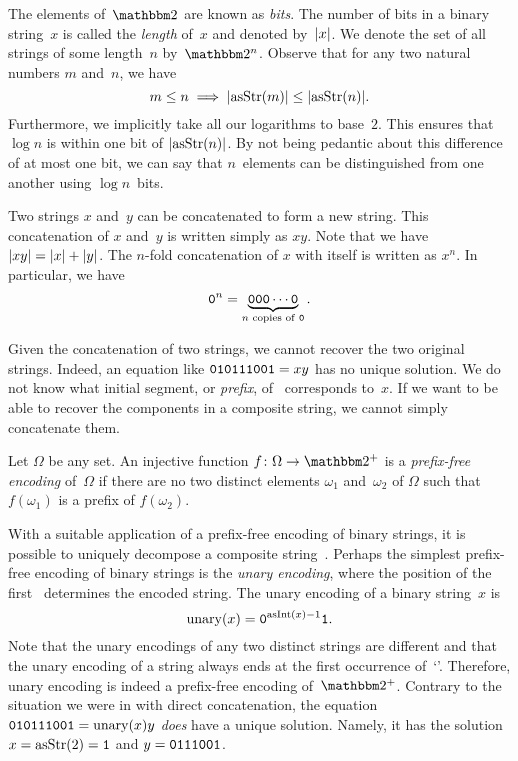 The elements of~$\binary$ are known as \emph{bits}.
The number of bits in a binary string~$x$ is called the \emph{length} of~$x$ and denoted by~${\lvert x\rvert}$.
We denote the set of all strings of some length~$n$ by~$\binary^n$.
Observe that for any two natural numbers $m$ and~$n$, we have
\begin{equation*}
  m \le n \implies {\lvert\operatorname{asStr}(m)\rvert} \le {\lvert\operatorname{asStr}(n)\rvert}.
\end{equation*}
Furthermore, we implicitly take all our logarithms to base~$2$.
This ensures that $\log n$ is within one bit of ${\lvert\operatorname{asStr}(n)\rvert}$.
By not being pedantic about this difference of at most one bit, we can say that $n$~elements can be distinguished from one another using $\log n$~bits.

Two strings $x$ and~$y$ can be concatenated to form a new string.
This concatenation of $x$ and~$y$ is written simply as $xy$.
Note that we have ${\lvert xy\rvert} = {\lvert x\rvert} + {\lvert y\rvert}$.
The $n$-fold concatenation of $x$ with itself is written as $x^n$.
In particular, we have
\begin{equation*}
  \textnormal{\texttt{0}}^n = \underbrace{\textnormal{\texttt{000}}\cdots\textnormal{\texttt{0}}}_{\text{$n$ copies of \textnormal{\texttt{0}}}}.
\end{equation*}

Given the concatenation of two strings, we cannot recover the two original strings.
Indeed, an equation like $\textnormal{\texttt{010111001}} = xy$ has no unique solution.
We do not know what initial segment, or \emph{prefix}, of~ corresponds to~$x$.
If we want to be able to recover the components in a composite string, we cannot simply concatenate them.
\begin{definition}
  Let $\Omega$ be any set.
  An injective function $f\colon \Omega \to \binary^+$ is a \emph{prefix-free encoding} of~$\Omega$ if there are no two distinct elements $\omega_1$ and~$\omega_2$ of $\Omega$ such that $f(\omega_1)$ is a prefix of $f(\omega_2)$.
\end{definition}

With a suitable application of a prefix-free encoding of binary strings, it is possible to uniquely decompose a composite string~\parencite{cover2006elements}.
Perhaps the simplest prefix-free encoding of binary strings is the \emph{unary encoding}, where the position of the first~ determines the encoded string.
The unary encoding of a binary string~$x$ is
\begin{equation*}
  \operatorname{unary}(x) = \textnormal{\texttt{0}}^{\operatorname{asInt}(x) - 1} \textnormal{\texttt{1}}.
\end{equation*}
Note that the unary encodings of any two distinct strings are different and that the unary encoding of a string always ends at the first occurrence of~`'.
Therefore, unary encoding is indeed a prefix-free encoding of~$\binary^+$.
Contrary to the situation we were in with direct concatenation, the equation $\textnormal{\texttt{010111001}} = \operatorname{unary}(x)y$ \emph{does} have a unique solution.
Namely, it has the solution $x = \operatorname{asStr}(2) = \textnormal{\texttt{1}}$ and $y = \textnormal{\texttt{0111001}}$.


